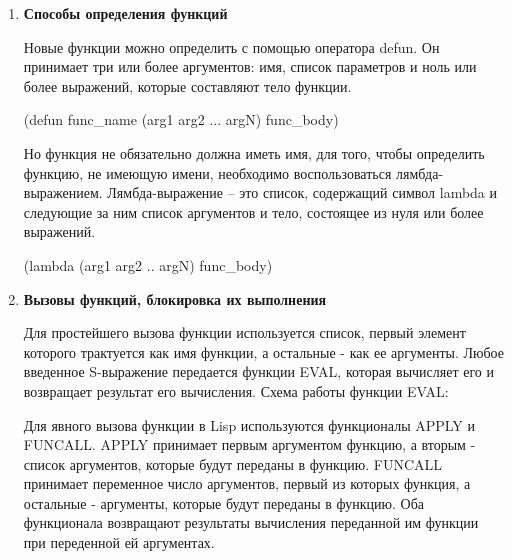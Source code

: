 \begin{enumerate}
\item \textbf{Способы определения функций}

Новые функции можно определить с помощью оператора defun. Он принимает три или более аргументов: имя, список параметров и ноль или более выражений, которые составляют тело функции. 

(defun func\_name (arg1 arg2 ... argN) func\_body)

Но функция не обязательно должна иметь имя, для того, чтобы определить функцию, не имеющую имени, необходимо воспользоваться лямбда-выражением. Лямбда-выражение – это список, содержащий символ lambda и следующие за ним список аргументов и тело, состоящее из нуля или более выражений.

(lambda (arg1 arg2 .. argN) func\_body)

\item \textbf{Вызовы функций, блокировка их выполнения}

Для простейшего вызова функции используется список, первый элемент которого трактуется как имя функции, а остальные - как ее аргументы. Любое введенное S-выражение передается функции EVAL, которая вычисляет его и возвращает результат его вычисления. Схема работы функции EVAL:
\begin{figure}[ht!]
\end{figure}

\newpage
\vspace*{10mm}
Для явного вызова функции в Lisp используются функционалы APPLY и FUNCALL. APPLY принимает первым аргументом функцию, а вторым - список аргументов, которые будут переданы в функцию. FUNCALL принимает переменное число аргументов, первый из которых функция, а остальные - аргументы, которые будут переданы в функцию. Оба функционала возвращают результаты вычисления переданной им функции при переденной ей аргументах.


\end{enumerate}
